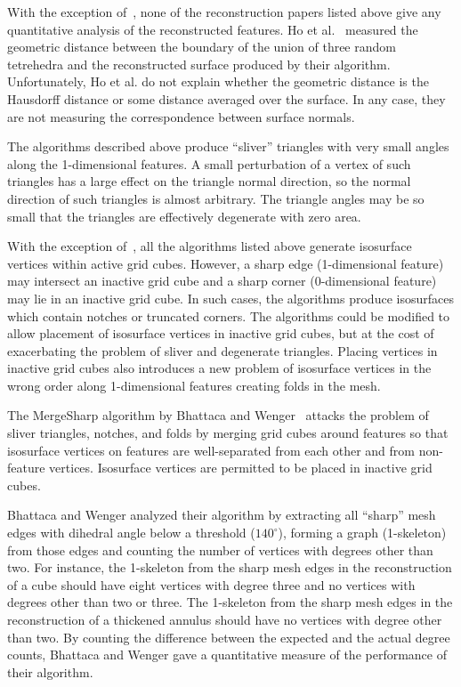 With the exception of~\cite{hwco-cmsaf-05},
none of the reconstruction papers listed above give any quantitative
analysis of the reconstructed features.
Ho et al.~\cite{hwco-cmsaf-05} measured the geometric distance
between the boundary of the union of three random tetrehedra and 
the reconstructed surface produced by their algorithm.
Unfortunately, Ho et al. do not explain whether the geometric distance
is the Hausdorff distance or some distance averaged over the surface.
In any case, they are not measuring the correspondence 
between surface normals.

The algorithms described above 
produce ``sliver'' triangles with very small angles 
along the 1-dimensional features.
A small perturbation of a vertex of such triangles
has a large effect on the triangle normal direction,
so the normal direction of such triangles is almost arbitrary.
The triangle angles may be so small that the triangles are effectively
degenerate with zero area.

With the exception of~\cite{sw-dmcpc-04},
all the algorithms listed above generate isosurface vertices
within active grid cubes.
However, a sharp edge (1-dimensional feature) may intersect 
an inactive grid cube  and a sharp corner (0-dimensional feature) 
may lie in an inactive grid cube.
In such cases, the algorithms produce isosurfaces which contain notches
or truncated corners.
The algorithms could be modified to allow placement of isosurface vertices
in inactive grid cubes,
but at the cost of exacerbating the problem 
of sliver and degenerate triangles.
Placing vertices in inactive grid cubes also introduces a new problem 
of isosurface vertices in the wrong order along 1-dimensional features
creating folds in the mesh.

The MergeSharp algorithm by Bhattaca and Wenger~\cite{bw-cisec-13,bw-erm-13}
attacks the problem of sliver triangles, notches, and folds
by merging grid cubes around features
so that isosurface vertices on features are well-separated 
from each other and from non-feature vertices.
Isosurface vertices are permitted to be placed in inactive grid cubes.

Bhattaca and Wenger analyzed their algorithm by extracting all 
``sharp'' mesh edges with dihedral angle below a threshold ($140^\circ$),
forming a graph (1-skeleton) from those edges
and counting the number of vertices with degrees other than two.
For instance, the 1-skeleton from the sharp mesh edges in the reconstruction
of a cube should have eight vertices with degree three
and no vertices with degrees other than two or three.
The 1-skeleton from the sharp mesh edges in the reconstruction
of a thickened annulus should have no vertices with degree other than two.
By counting the difference between the expected and the actual degree counts,
Bhattaca and Wenger gave a quantitative measure of the performance
of their algorithm.

